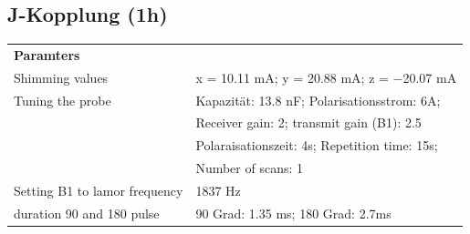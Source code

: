 \subsection{J-Kopplung (1h)}


    \begin{tabular}{ll}

        {\bf Paramters} &            \\
        
        Shimming values & x = 10.11 mA; y = 20.88 mA; z = −20.07 mA \\
        
        Tuning the probe & Kapazität: 13.8 nF; Polarisationsstrom: 6A;\\
        & Receiver gain: 2; transmit gain (B1): 2.5\\
        & Polaraisationszeit: 4s; Repetition time: 15s; \\
        & Number of scans: 1\\
        
        Setting B1 to lamor frequency &    1837 Hz \\
        
        duration 90 and 180 pulse & 90 Grad: 1.35 ms; 180 Grad: 2.7ms \\
    \end{tabular} 

    \vspace{1cm}

